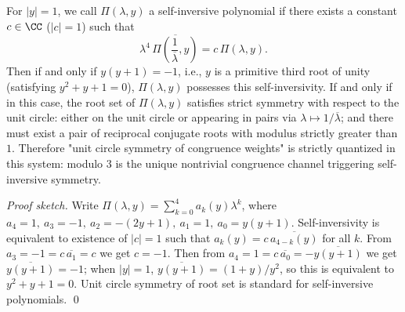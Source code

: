 \begin{conclusion}[Uniqueness of self-inversive congruence channel: only \(y^2+y+1=0\) triggers unit circle symmetry]\label{con:xi-terminal-zm-self-inversive-unique}
For \(|y|=1\), we call \(\Pi(\lambda,y)\) a self-inversive polynomial
if there exists a constant \(c\in\CC\) (\(|c|=1\)) such that
\[
\lambda^4\,\overline{\Pi\!\left(\frac{1}{\overline{\lambda}},y\right)}=c\,\Pi(\lambda,y).
\]
Then if and only if \(y(y+1)=-1\), i.e., \(y\) is a primitive third root of unity (satisfying \(y^2+y+1=0\)), \(\Pi(\lambda,y)\) possesses this self-inversivity.
If and only if in this case, the root set of \(\Pi(\lambda,y)\) satisfies strict symmetry with respect to the unit circle: either on the unit circle or appearing in pairs via
\(\lambda\mapsto 1/\overline{\lambda}\); and there must exist a pair of reciprocal conjugate roots with modulus strictly greater than \(1\).
Therefore "unit circle symmetry of congruence weights" is strictly quantized in this system: modulo \(3\) is the unique nontrivial congruence channel triggering self-inversive symmetry.
\end{conclusion}
\begin{proof}[Proof sketch]
Write
\(
\Pi(\lambda,y)=\sum_{k=0}^{4}a_k(y)\lambda^k
\), where
\(
a_4=1,\ a_3=-1,\ a_2=-(2y+1),\ a_1=1,\ a_0=y(y+1)
\).
Self-inversivity is equivalent to existence of \(|c|=1\) such that \(a_k(y)=c\,\overline{a_{4-k}(y)}\) for all \(k\).
From \(a_3=-1=c\,\overline{a_1}=c\) we get \(c=-1\).
Then from \(a_4=1=c\,\overline{a_0}=-\overline{y(y+1)}\) we get \(\overline{y(y+1)}=-1\);
when \(|y|=1\), \(\overline{y(y+1)}=(1+y)/y^2\), so this is equivalent to \(y^2+y+1=0\).
Unit circle symmetry of root set is standard for self-inversive polynomials. \qed
\end{proof}

